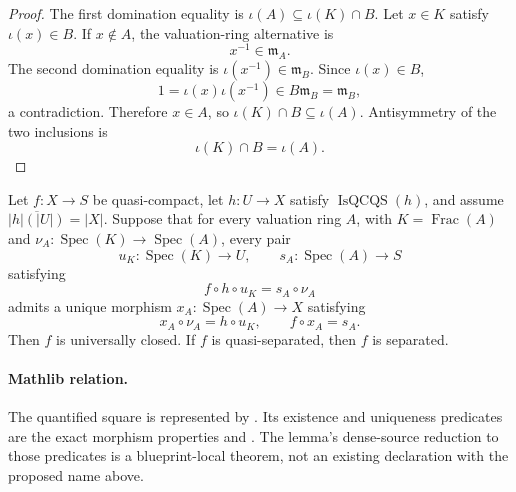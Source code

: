 \begin{proof}
  The first domination equality is
  $\iota(A)\subseteq\iota(K)\cap B$.  Let $x\in K$ satisfy $\iota(x)\in B$.
  If $x\notin A$, the valuation-ring alternative is
  \[
    x^{-1}\in\mathfrak m_A.
  \]
  The second domination equality is
  $\iota(x^{-1})\in\mathfrak m_B$.  Since $\iota(x)\in B$,
  \[
    1=\iota(x)\iota(x^{-1})\in B\mathfrak m_B=\mathfrak m_B,
  \]
  a contradiction.  Therefore $x\in A$, so
  $\iota(K)\cap B\subseteq\iota(A)$.  Antisymmetry of the two inclusions is
  \[
    \iota(K)\cap B=\iota(A).
  \]
\end{proof}

\begin{lemma}
  \label{lemma:nagata-dense-source-valuative}

  Let $f\colon X\to S$ be quasi-compact, let $h\colon U\to X$ satisfy
  $\operatorname{IsQCQS}(h)$, and assume
  $\overline{|h|(|U|)}=|X|$.  Suppose that for every valuation ring $A$,
  with $K=\operatorname{Frac}(A)$ and
  $\nu_A\colon\operatorname{Spec}(K)\to\operatorname{Spec}(A)$, every pair
  \[
    u_K\colon\operatorname{Spec}(K)\to U,
    \qquad
    s_A\colon\operatorname{Spec}(A)\to S
  \]
  satisfying
  \[
    f\circ h\circ u_K=s_A\circ\nu_A
  \]
  admits a unique morphism
  $x_A\colon\operatorname{Spec}(A)\to X$ satisfying
  \[
    x_A\circ\nu_A=h\circ u_K,
    \qquad
    f\circ x_A=s_A.
  \]
  Then $f$ is universally closed.  If $f$ is quasi-separated, then $f$ is
  separated.

  \paragraph{Mathlib relation.}
  The quantified square is represented by
  \texttt{}.  Its existence
  and uniqueness predicates are the exact morphism properties
  \texttt{} and
  \texttt{}.
  The lemma's dense-source reduction to those predicates is a
  blueprint-local theorem, not an existing declaration with the proposed
  name above.
\end{lemma}

